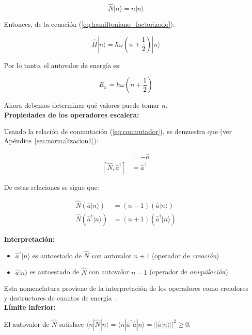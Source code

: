 \documentclass[11pt,a4paper,spanish]{book}
\begin{document}
\begin{equation}
	\hat{N}|n\rangle = n|n\rangle
\end{equation}

Entonces, de la ecuación (\ref{eq:hamiltoniano_factorizado}):

\begin{equation}
	\hat{H}|n\rangle = \hbar\omega\left(n + \frac{1}{2}\right)|n\rangle
\end{equation}

Por lo tanto, el autovalor de energía es:

\begin{equation}
	E_n = \hbar\omega\left(n + \frac{1}{2}\right)
\end{equation}

Ahora debemos determinar qué valores puede tomar $n$.\\

\textbf{Propiedades de los operadores escalera:}

Usando la relación de conmutación (\ref{eq:conmutador}), se demuestra que (ver Apéndice~\ref{sec:normalizacion1}):

\begin{align}
	[\hat{N}, \hat{a}] &= -\hat{a} \\
	[\hat{N}, \hat{a}^\dagger] &= \hat{a}^\dagger
\end{align}

De estas relaciones se sigue que:

\begin{align}
	\hat{N}(\hat{a}|n\rangle) &= (n-1)(\hat{a}|n\rangle) \\
	\hat{N}(\hat{a}^\dagger|n\rangle) &= (n+1)(\hat{a}^\dagger|n\rangle)
\end{align}

\textbf{Interpretación:}
\begin{itemize}
	\item $\hat{a}^\dagger|n\rangle$ es autoestado de $\hat{N}$ con autovalor $n+1$ (operador de \emph{creación})
	\item $\hat{a}|n\rangle$ es autoestado de $\hat{N}$ con autovalor $n-1$ (operador de \emph{aniquilación})
\end{itemize}

Esta nomenclatura proviene de la interpretación de los operadores como creadores y destructores de cuantos de energía \citep{dirac1927}.\\

\textbf{Límite inferior:}

El autovalor de $\hat{N}$ satisface $\langle n|\hat{N}|n\rangle = \langle n|\hat{a}^\dagger\hat{a}|n\rangle = ||\hat{a}|n\rangle||^2 \geq 0$.
\end{document}
